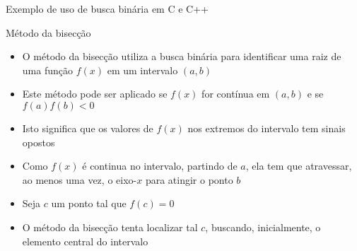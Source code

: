 \begin{frame}[fragile]{Exemplo de uso de busca binária em C e C++}
\end{frame}

\begin{frame}[fragile]{Método da bisecção}

    \begin{itemize}
        \item O método da bisecção utiliza a busca binária para identificar uma raiz de uma
            função $f(x)$ em um intervalo $(a, b)$

        \item Este método pode ser aplicado se $f(x)$ for contínua em $(a, b)$ e se
            $f(a)f(b) < 0$

        \item Isto significa que os valores de $f(x)$ nos extremos do intervalo tem sinais opostos

        \item Como $f(x)$ é continua no intervalo, partindo de $a$, ela tem que atravessar, ao
            menos uma vez, o eixo-$x$ para atingir o ponto $b$

        \item Seja $c$ um ponto tal que $f(c) = 0$

        \item O método da bisecção tenta localizar tal $c$, buscando, inicialmente, o elemento
            central do intervalo
    \end{itemize}

\end{frame}


